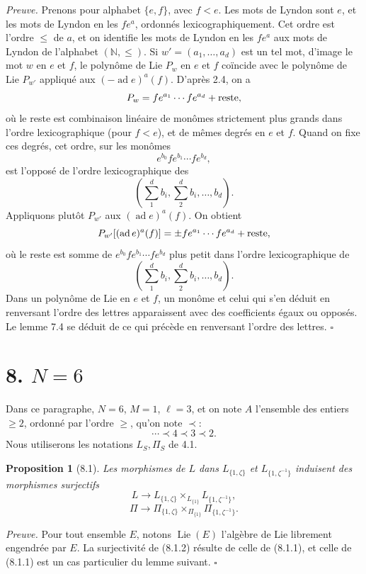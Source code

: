 \documentclass[10pt,a4paper]{article}
\newcommand{\Lie}{\operatorname{Lie}}
\newcommand{\ad}{\operatorname{ad}}
\theoremstyle{deligne}
\newtheorem*{proposition*}{Proposition}
\newenvironment{proofdel}{\textit{Preuve.}}{\hfill$\square$}
\begin{document}
\begin{proofdel}
Prenons pour alphabet \(\{e,f\}\), avec \(f<e\). Les mots de Lyndon sont \(e\), et les mots de Lyndon en les \(fe^a\), ordonnés lexicographiquement. Cet ordre est l'ordre \(\le\) de \(a\), et on identifie les mots de Lyndon en les \(fe^a\) aux mots de Lyndon de l'alphabet \((\mathbb N,\le)\). Si \(w'=(a_1,\ldots,a_d)\) est un tel mot, d'image le mot \(w\) en \(e\) et \(f\), le polynôme de Lie \(P_w\) en \(e\) et \(f\) coïncide avec le polynôme de Lie \(P_{w'}\) appliqué aux \((-\ad e)^a(f)\). D'après 2.4, on a
\[
P_w=fe^{a_1}\cdots fe^{a_d}+\hbox{reste},
\]
où le reste est combinaison linéaire de monômes strictement plus grands dans l'ordre lexicographique (pour \(f<e\)), et de mêmes degrés en \(e\) et \(f\). Quand on fixe ces degrés, cet ordre, sur les monômes
\[
e^{b_0}fe^{b_1}\cdots fe^{b_d},
\]
est l'opposé de l'ordre lexicographique des
\[
\left(\sum_1^d b_i,\sum_2^d b_i,\ldots,b_d\right).
\]
Appliquons plutôt \(P_{w'}\) aux \((\ad e)^a(f)\). On obtient
\[
P_{w'}[(\ad e)^a(f)]=\pm fe^{a_1}\cdots fe^{a_d}+\hbox{reste},
\]
où le reste est somme de \(e^{b_0}fe^{b_1}\cdots fe^{b_d}\) plus petit dans l'ordre lexicographique de
\[
\left(\sum_1^d b_i,\sum_2^d b_i,\ldots,b_d\right).
\]
Dans un polynôme de Lie en \(e\) et \(f\), un monôme et celui qui s'en déduit en renversant l'ordre des lettres apparaissent avec des coefficients égaux ou opposés. Le lemme 7.4 se déduit de ce qui précède en renversant l'ordre des lettres.
\end{proofdel}

\section*{8. \(N=6\)}

Dans ce paragraphe, \(N=6\), \(M=1\), \(\ell=3\), et on note \(A\) l'ensemble des entiers \(\ge2\), ordonné par l'ordre \(\ge\), qu'on note \(\prec\):
\[
\cdots\prec4\prec3\prec2.
\]
Nous utiliserons les notations \(L_S,\Pi_S\) de 4.1.

\begin{proposition*}[8.1]
Les morphismes de \(L\) dans \(L_{\{1,\zeta\}}\) et \(L_{\{1,\zeta^{-1}\}}\) induisent des morphismes surjectifs
\[
\tag{8.1.1}
L\longrightarrow L_{\{1,\zeta\}}\times_{L_{\{1\}}}L_{\{1,\zeta^{-1}\}},
\]
\[
\tag{8.1.2}
\Pi\longrightarrow \Pi_{\{1,\zeta\}}\times_{\Pi_{\{1\}}}\Pi_{\{1,\zeta^{-1}\}}.
\]
\end{proposition*}

\begin{proofdel}
Pour tout ensemble \(E\), notons \(\Lie(E)\) l'algèbre de Lie librement engendrée par \(E\). La surjectivité de (8.1.2) résulte de celle de (8.1.1), et celle de (8.1.1) est un cas particulier du lemme suivant.
\end{proofdel}
\end{document}
